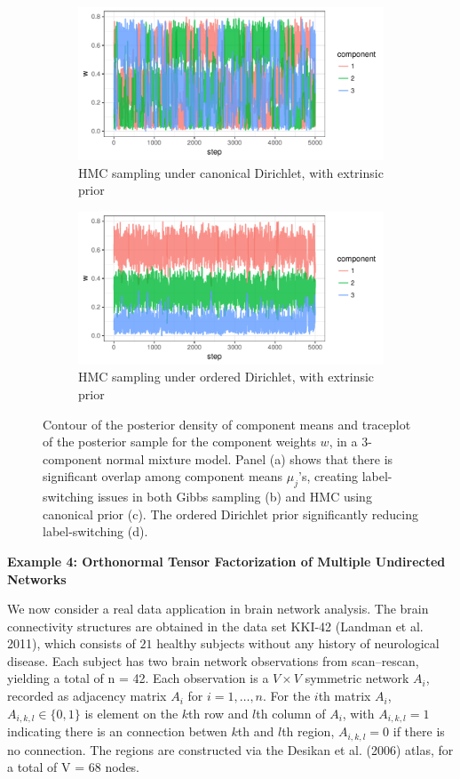 \documentclass[10pt]{article}
\DeclareMathOperator{\1}{\mathbbm{1}}
\begin{document}
\begin{figure}[H]
\begin{subfigure}[b]{0.32\textwidth}
  \includegraphics[width=1\textwidth]{fmm_w_hmc_unordered.pdf}
    \caption{HMC sampling under canonical Dirichlet, with extrinsic prior}
      \end{subfigure}
       \begin{subfigure}[b]{0.32\textwidth}
 \includegraphics[width=1\textwidth]{fmm_w_hmc.pdf}
     \caption{HMC sampling under ordered Dirichlet, with extrinsic prior}
     \end{subfigure}
\caption{Contour of the posterior density of component means and traceplot of the posterior sample for the component weights $w$, in a 3-component normal mixture model. Panel (a) shows that there is significant overlap among component means $\mu_j$'s, creating label-switching issues in both Gibbs sampling (b) and HMC using canonical prior (c). The ordered Dirichlet prior significantly reducing label-switching (d).}
\label{dirichlet}
\end{figure}


{\bf Example 4: Orthonormal Tensor Factorization of Multiple Undirected Networks}

We now consider a real data application in brain network analysis. The brain connectivity structures are obtained in the data set KKI-42 (Landman et al. 2011), which consists of $21$ healthy subjects without any history of neurological disease. Each subject has two brain network observations from scan--rescan, yielding a total of n = 42. Each observation is a $V\times V$ symmetric network $A_i$, recorded as adjacency matrix $A_i$ for $i=1,\ldots,n$. For the $i$th matrix $A_i$, $A_{i,k,l} \in \{0,1\}$ is element on the $k$th row and $l$th column of $A_i$, with $A_{i,k,l}=1$ indicating there is an connection betwen $k$th and $l$th region, $A_{i,k,l}=0$ if there is no connection. The regions are constructed via the Desikan et al. (2006) atlas, for a total of V = 68 nodes.
\end{document}
